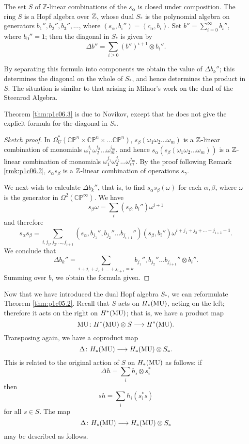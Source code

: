 \documentclass[../main]{subfiles}
\begin{document}
\begin{theorem}\label{thm:p1c06.3}
The set $S$ of $\mathbb{Z}$-linear combinations of the $s_\alpha$ is closed under composition. The ring $S$ is a Hopf algebra over $\mathbb{Z}$, whose dual $S_*$ is the polynomial algebra on generators $b_1'',b_2'',b_3'',\dots$, where $(s_\alpha,b_i'') = (c_\alpha,b_i)$. Set $b'' = \displaystyle\sum_{i=0}^\infty b_i''$, where $b_0'' = 1$; then the diagonal in $S_*$ is given by 
\[\Delta b'' = \sum_{i \geq 0} (b'')^{i+1} \otimes b_i ''.\]
\end{theorem}
\begin{explanation}
By separating this formula into components we obtain the value of $\Delta b_k''$; this determines the diagonal on the whole of $S_*$, and hence determines the product in $S$. The situation is similar to that arising in Milnor's work on the dual of the Steenrod Algebra.
\end{explanation}
Theorem \ref{thm:p1c06.3} is due to Novikov, except that he does not give the explicit formula for the diagonal in $S_*$.
\begin{proof}[Sketch proof]
In $\Omega_U^*(\mathbb{CP}^n \times \mathbb{CP}^n \times \dots \mathbb{CP}^n)$, $s_\beta(\omega_1 \omega_2 \dots \omega_m)$ is a $\mathbb{Z}$-linear combination of monomials $\omega_1^{i_1} \omega_2^{i_2} \dots \omega_m^{i_m}$, and hence $s_\alpha(s_\beta(\omega_1 \omega_2 \dots \omega_m))$ is a $\mathbb{Z}$-linear combination of monomials  $\omega_1^{j_1} \omega_2^{j_2} \dots \omega_m^{j_m}$. By the proof following Remark \ref{rmk:p1c06.2}, $s_\alpha s_\beta$ is a $\mathbb{Z}$-linear combination of operations $s_\gamma$.

We next wish to calculate $\Delta b_k''$, that is, to find $s_\alpha s_\beta(\omega)$ for each $\alpha,\beta$, where $\omega$ is the generator in $\Omega^2(\mathbb{CP}^\infty)$. We have
\[s_\beta \omega = \sum_i (s_\beta , b_i'')\omega^{i+1}\]
and therefore
\[s_\alpha s_\beta = \sum_{i,j_1,j_2,\dots,j_{i+1}} (s_\alpha, b_{j_1}'',b_{j_2}'' \dots b_{j_{i+1}}'')(s_\beta,b_i'') \omega^{i + j_1 + j_2 + \dots + j_{i+1}+1}.\]
We conclude that
\[\Delta b_k'' = \sum_{i + j_1 + j_2 + \dots + j_{i+1} = k}b_{j_1}'',b_{j_2}'' \dots b_{j_{i+1}}'' \otimes b_i''.\]
Summing over $b$, we obtain the formula given.
\end{proof}
\begin{note}
Now that we have introduced the dual Hopf algebra $S_*$, we can reformulate Theorem \ref{thm:p1c05.2}. Recall that $S$ acts on $H_*(\mathrm{MU})$, acting on the left; therefore it acts on the right on $H^*(\mathrm{MU})$; that is, we have a product map
\[\mathrm{MU}\colon H^*(\mathrm{MU}) \otimes S \longrightarrow H^*(\mathrm{MU}).\]
Transposing again, we have a coproduct map
\[\Delta\colon H_*(\mathrm{MU}) \longrightarrow H_*(\mathrm{MU}) \otimes S_*.\]
This is related to the original action of $S$ on $H_*(\mathrm{MU})$ as follows: if
\[\Delta h = \sum_i h_i \otimes s_i^*\]
then
\[sh = \sum_i h_i(s_i^* s)\]
for all $s \in S$. The map
\[\Delta \colon H_*(\mathrm{MU}) \longrightarrow H_*(\mathrm{MU}) \otimes S_*\]
may be described as follows.
\end{note}
\end{document}
